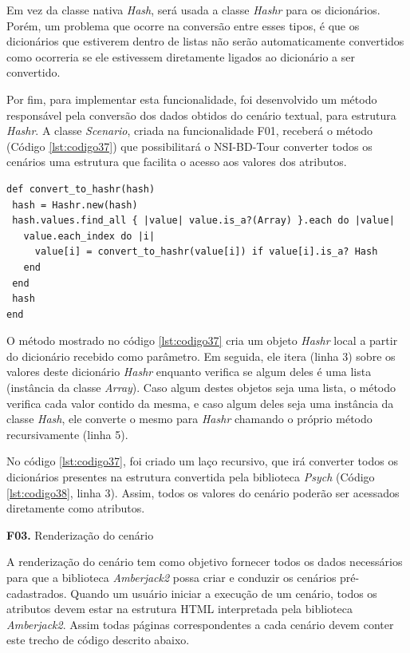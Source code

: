 Em vez da classe nativa \textit{Hash}, será usada a classe \textit{Hashr} para os dicionários. Porém, um problema que ocorre na conversão entre esses tipos, é que os dicionários que estiverem dentro de listas não serão automaticamente convertidos como ocorreria se ele estivessem diretamente ligados ao dicionário a ser convertido.


Por fim, para implementar esta funcionalidade, foi desenvolvido um método responsável pela conversão dos dados obtidos do cenário textual, para estrutura \textit{Hashr}. A classe \textit{Scenario}, criada na funcionalidade F01, receberá o método (Código \ref{lst:codigo37}) que possibilitará o NSI-BD-Tour converter todos os cenários uma estrutura que facilita o acesso aos valores dos atributos.

{\singlespace
\begin{lstlisting}[caption=Método de conversão para \textit{Hashr},label={lst:codigo37}]
def convert_to_hashr(hash)
 hash = Hashr.new(hash)
 hash.values.find_all { |value| value.is_a?(Array) }.each do |value|
   value.each_index do |i|
     value[i] = convert_to_hashr(value[i]) if value[i].is_a? Hash
   end
 end
 hash
end
\end{lstlisting}
}

O método mostrado no código \ref{lst:codigo37} cria um objeto \textit{Hashr} local a partir do dicionário recebido como parâmetro. Em seguida, ele itera (linha 3) sobre os valores deste dicionário \textit{Hashr} enquanto verifica se algum deles é uma lista (instância da classe \textit{Array}). Caso algum destes objetos seja uma lista, o método verifica cada valor contido da mesma, e caso algum deles seja uma instância da classe \textit{Hash}, ele converte o mesmo para \textit{Hashr} chamando o próprio método recursivamente (linha 5).

No código \ref{lst:codigo37}, foi criado um laço recursivo, que irá converter todos os dicionários presentes na estrutura convertida pela biblioteca \textit{Psych} (Código \ref{lst:codigo38}, linha 3). Assim, todos os valores do cenário poderão ser acessados diretamente como atributos.

\textbf{F03.} Renderização do cenário

A renderização do cenário tem como objetivo fornecer todos os dados necessários para que a biblioteca \textit{Amberjack2} possa criar e conduzir os cenários pré-cadastrados. Quando um usuário iniciar a execução de um cenário, todos os atributos devem estar na estrutura HTML interpretada pela biblioteca \textit{Amberjack2}. Assim todas páginas correspondentes a cada cenário devem conter este trecho de código descrito abaixo.

